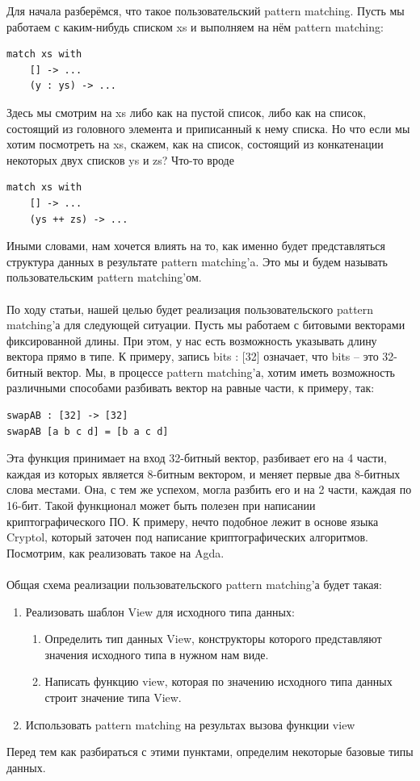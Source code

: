 \documentclass[8pt]{extarticle}
\begin{document}
Для начала разберёмся, что такое пользовательский pattern matching. Пусть мы работаем с каким-нибудь списком xs и выполняем на нём pattern matching:
\begin{lstlisting}
match xs with 
	[] -> ...
	(y : ys) -> ...
\end{lstlisting}
Здесь мы смотрим на xs либо как на пустой список, либо как на список, состоящий из головного элемента и приписанный к нему списка. Но что если мы хотим посмотреть на xs, скажем, как на список, состоящий из конкатенации некоторых двух списков ys и zs? Что-то вроде
\begin{lstlisting}
match xs with
	[] -> ...
	(ys ++ zs) -> ...
\end{lstlisting}
Иными словами, нам хочется влиять на то, как именно будет представляться структура данных в результате pattern matching'a. Это мы и будем называть пользовательским pattern matching'ом.\\
\\
По ходу статьи, нашей целью будет реализация пользовательского pattern matching'а для следующей ситуации. Пусть мы работаем с битовыми векторами фиксированной длины. При этом, у нас есть возможность указывать длину вектора прямо в типе. К примеру, запись bits : [32] означает, что bits -- это 32-битный вектор. Мы, в процессе pattern matching'а, хотим иметь возможность различными способами разбивать вектор на равные части, к примеру, так:
\begin{lstlisting}
swapAB : [32] -> [32]
swapAB [a b c d] = [b a c d]
\end{lstlisting}
Эта функция принимает на вход 32-битный вектор, разбивает его на 4 части, каждая из которых является 8-битным вектором, и меняет первые два 8-битных слова местами. Она, с тем же успехом, могла разбить его и на 2 части, каждая по 16-бит. Такой функционал может быть полезен при написании криптографического ПО. К примеру, нечто подобное лежит в основе языка Cryptol, который заточен под написание криптографических алгоритмов. Посмотрим, как реализовать такое на Agda.\\
\\
Общая схема реализации пользовательского pattern matching'а будет такая:
\begin{enumerate}
\item Реализовать шаблон View для исходного типа данных: 

\begin{enumerate}
\item Определить тип данных View, конструкторы которого представляют значения исходного типа в нужном нам виде.
\item Написать функцию view, которая по значению исходного типа данных строит значение типа View.
\end{enumerate}

\item Использовать pattern matching на результах вызова функции view
\end{enumerate}
Перед тем как разбираться с этими пунктами, определим некоторые базовые типы данных.
\end{document}
